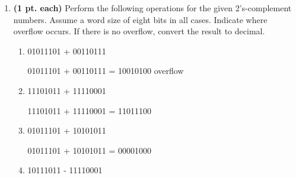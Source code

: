 \begin{enumerate}
\begin{enumerate}
\begin{solution}{
$35 = 32+2+1 = 100011 = 00100011$, thus $-35=11011101$
} \end{solution}

\item  -128 

\begin{solution}{
This is a special case, see page 10 for more information.
$-128 = 10000000$
} \end{solution}

\item  67 

\begin{solution}{
$67=64+2+1 = 100 0011 = 0100 0011$
} \end{solution}

\item  128 

\begin{solution}{
There are not enough bits to represent this positive number; hence
the 8-bit representation does not exist.
} \end{solution}

\end{enumerate}


\item {\bf (1 pt. each)} Perform the following operations for the given 
2's-complement numbers. Assume a word size of eight bits
in all cases. Indicate where overflow occurs. If there is no overflow, 
convert the result to decimal. 
\begin{enumerate}

\item 01011101 + 00110111 

\begin{solution}{
 01011101 + 00110111 = 10010100  overflow
} \end{solution}

\item 11101011 + 11110001 

\begin{solution}{
 11101011 + 
 11110001 =
 11011100
} \end{solution}

\item 01011101 + 10101011 

\begin{solution}{
 01011101 + 
 10101011 =
 00001000
} \end{solution}

\item 10111011 - 11110001 


\end{enumerate}
\end{enumerate}
